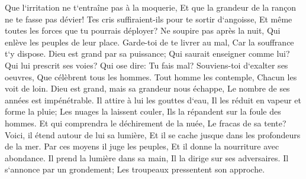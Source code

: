 \verse Que l`irritation ne t`entraîne pas à la moquerie, Et que la grandeur de la rançon ne te fasse pas dévier! 
\verse Tes cris suffiraient-ils pour te sortir d`angoisse, Et même toutes les forces que tu pourrais déployer? 
\verse Ne soupire pas après la nuit, Qui enlève les peuples de leur place. 
\verse Garde-toi de te livrer au mal, Car la souffrance t`y dispose. 
\verse Dieu est grand par sa puissance; Qui saurait enseigner comme lui? 
\verse Qui lui prescrit ses voies? Qui ose dire: Tu fais mal? 
\verse Souviens-toi d`exalter ses oeuvres, Que célèbrent tous les hommes. 
\verse Tout homme les contemple, Chacun les voit de loin. 
\verse Dieu est grand, mais sa grandeur nous échappe, Le nombre de ses années est impénétrable. 
\verse Il attire à lui les gouttes d`eau, Il les réduit en vapeur et forme la pluie; 
\verse Les nuages la laissent couler, Ils la répandent sur la foule des hommes. 
\verse Et qui comprendra le déchirement de la nuée, Le fracas de sa tente? 
\verse Voici, il étend autour de lui sa lumière, Et il se cache jusque dans les profondeurs de la mer. 
\verse Par ces moyens il juge les peuples, Et il donne la nourriture avec abondance. 
\verse Il prend la lumière dans sa main, Il la dirige sur ses adversaires. 
\verse Il s`annonce par un grondement; Les troupeaux pressentent son approche. 

